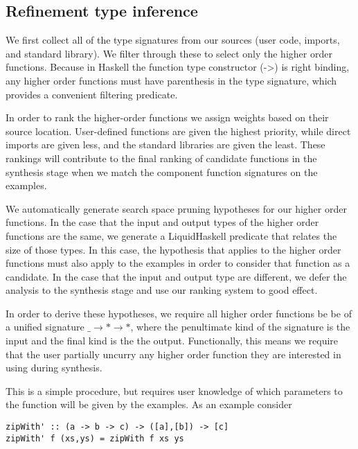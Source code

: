 \subsection{Refinement type inference}

We first collect all of the type signatures from our sources (user code, imports, and standard library). We filter through these to select only the higher order functions. Because in Haskell the function type constructor (->) is right binding, any higher order functions must have parenthesis in the type signature, which provides a convenient filtering predicate.

In order to rank the higher-order functions we assign weights based on their source location. User-defined functions are given the highest priority, while direct imports are given less, and the standard libraries are given the least. These rankings will contribute to the final ranking of candidate functions in the synthesis stage when we match the component function signatures on the examples.


We automatically generate search space pruning hypotheses for our higher order functions.
In the case that the input and output types of the higher order functions are the same, we generate a LiquidHaskell predicate that relates the size of those types.
In this case, the hypothesis that applies to the higher order functions must also apply to the examples in order to consider that function as a candidate.
In the case that the input and output type are different, we defer the analysis to the synthesis stage and use our ranking system to good effect.

In order to derive these hypotheses, we require all higher order functions be be of a unified signature \texttt{$\_ \to * \to *$}, where the penultimate kind of the signature is the input and the final kind is the the output.  Functionally, this means we require that the user partially uncurry any higher order function they are interested in using during synthesis.

This is a simple procedure, but requires user knowledge of which parameters to the function will be given by the examples. 
As an example consider 

\begin{verbatim}
zipWith' :: (a -> b -> c) -> ([a],[b]) -> [c]
zipWith' f (xs,ys) = zipWith f xs ys
\end{verbatim}


